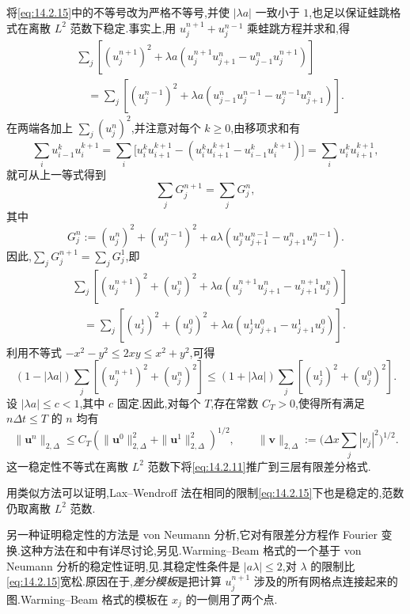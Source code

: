 将\eqref{eq:14.2.15}中的不等号改为严格不等号,并使 \(|\lambda a|\) 一致小于 \(1\),也足以保证蛙跳格式在离散 \(L^2\) 范数下稳定.事实上,用 \(u_j^{n+1}+u_j^{n-1}\) 乘蛙跳方程并求和,得
\[
  \begin{aligned}
    &\sum_j[(u_j^{n+1})^2+\lambda a(u_j^{n+1}u_{j+1}^n-u_{j-1}^n u_j^{n+1})]\\
    &\quad=\sum_j[(u_j^{n-1})^2+\lambda a(u_{j-1}^n u_j^{n-1}-u_j^{n-1}u_{j+1}^n)].
  \end{aligned}
\]
在两端各加上 \(\sum_j(u_j^n)^2\),并注意对每个 \(k\ge0\),由移项求和有
\[
  \sum_i u_{i-1}^k u_i^{k+1}
    =\sum_i\bigl[u_i^k u_{i+1}^{k+1}
        -(u_i^k u_{i+1}^{k+1}-u_{i-1}^k u_i^{k+1})\bigr]
    =\sum_i u_i^k u_{i+1}^{k+1},
\]
就可从上一等式得到
\[
  \sum_j G_j^{n+1}=\sum_j G_j^n,
\]
其中
\[
  G_j^n:=(u_j^n)^2+(u_j^{n-1})^2
          +a\lambda(u_j^n u_{j+1}^{n-1}-u_{j+1}^n u_j^{n-1}).
\]
因此,\(\sum_j G_j^{n+1}=\sum_j G_j^1\),即
\[
  \begin{aligned}
    &\sum_j[(u_j^{n+1})^2+(u_j^n)^2+\lambda a(u_j^{n+1}u_{j+1}^n-u_{j+1}^{n+1}u_j^n)]\\
    &\quad=\sum_j[(u_j^1)^2+(u_j^0)^2+\lambda a(u_j^1u_{j+1}^0-u_{j+1}^1u_j^0)].
  \end{aligned}
\]
利用不等式 \(-x^2-y^2\le2xy\le x^2+y^2\),可得
\[
  (1-|\lambda a|)\sum_j[(u_j^{n+1})^2+(u_j^n)^2]
     \le(1+|\lambda a|)\sum_j[(u_j^1)^2+(u_j^0)^2].
\]
设 \(|\lambda a|\le c<1\),其中 \(c\) 固定.因此,对每个 \(T\),存在常数 \(C_T>0\),使得所有满足 \(n\Delta t\le T\) 的 \(n\) 均有
\[
  \|\boldsymbol{u}^n\|_{2,\Delta}
    \le C_T(\|\boldsymbol{u}^0\|_{2,\Delta}^2+\|\boldsymbol{u}^1\|_{2,\Delta}^2)^{1/2},
  \qquad
  \|\boldsymbol{v}\|_{2,\Delta}:=\biggl(\Delta x\sum_j|v_j|^2\biggr)^{1/2}.
\]
这一稳定性不等式在离散 \(L^2\) 范数下将\eqref{eq:14.2.11}推广到三层有限差分格式.

用类似方法可以证明,Lax--Wendroff 法在相同的限制\eqref{eq:14.2.15}下也是稳定的,范数仍取离散 \(L^2\) 范数.

另一种证明稳定性的方法是 von Neumann 分析,它对有限差分方程作 Fourier 变换.这种方法在和中有详尽讨论,另见.Warming--Beam 格式的一个基于 von Neumann 分析的稳定性证明,见.其稳定性条件是 \(|a\lambda|\le2\),对 \(\lambda\) 的限制比\eqref{eq:14.2.15}宽松.原因在于,\emph{差分模板}是把计算 \(u_j^{n+1}\) 涉及的所有网格点连接起来的图.Warming--Beam 格式的模板在 \(x_j\) 的一侧用了两个点.

